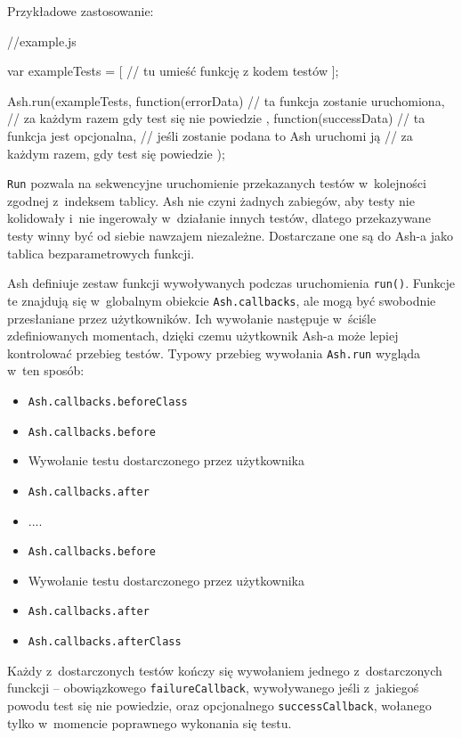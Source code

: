 \documentclass{xmgr}
\begin{document}
Przykładowe zastosowanie: 

\begin{javascriptcode}
     //example.js

    var exampleTests = [
	//  tu umieść funkcję z kodem testów 
    ];

    Ash.run(exampleTests, function(errorData){
      // ta funkcja zostanie uruchomiona, 
      //   za każdym razem gdy test się nie powiedzie
    }, function(successData){
      // ta funkcja jest opcjonalna, 
      //   jeśli zostanie podana to Ash uruchomi ją 
      //   za każdym razem, gdy test się powiedzie
    });
\end{javascriptcode}

\texttt{Run} pozwala na sekwencyjne uruchomienie przekazanych testów w~kolejności zgodnej z~indeksem tablicy. Ash nie czyni żadnych zabiegów, aby testy nie kolidowały i~nie ingerowały w~działanie innych testów, dlatego przekazywane testy winny być od siebie nawzajem niezależne. Dostarczane one są do Ash-a jako tablica bezparametrowych funkcji.

Ash definiuje zestaw funkcji wywoływanych podczas uruchomienia \texttt{run()}. Funkcje te znajdują się w~globalnym obiekcie \texttt{Ash.callbacks}, ale mogą być swobodnie przesłaniane przez użytkowników. Ich wywołanie następuje w~ściśle zdefiniowanych momentach, dzięki czemu użytkownik Ash-a może lepiej kontrolować przebieg testów. Typowy przebieg wywołania \texttt{Ash.run} wygląda w~ten sposób:

\begin{itemize}
  \item \texttt{Ash.callbacks.beforeClass}
  \item \texttt{Ash.callbacks.before}
  \item Wywołanie testu dostarczonego przez użytkownika
  \item \texttt{Ash.callbacks.after}
  \item ....
  \item \texttt{Ash.callbacks.before}
  \item Wywołanie testu dostarczonego przez użytkownika
  \item \texttt{Ash.callbacks.after}
  \item \texttt{Ash.callbacks.afterClass}
\end{itemize}

Każdy z~dostarczonych testów kończy się wywołaniem jednego z~dostarczonych funckcji -- obowiązkowego \texttt{failureCallback}, wywoływanego jeśli z~jakiegoś powodu test się nie powiedzie, oraz opcjonalnego \texttt{successCallback}, wołanego tylko w~momencie poprawnego wykonania się testu.
\end{document}
